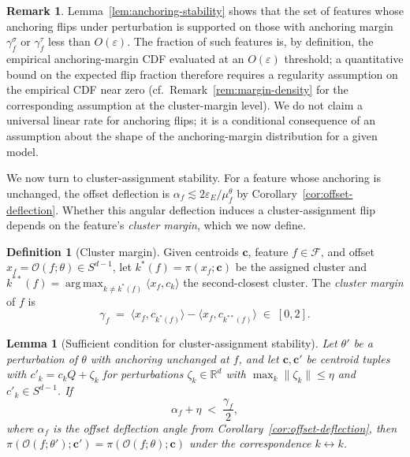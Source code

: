 \documentclass[11pt,letterpaper]{article}
\newtheorem{lemma}[theorem]{Lemma}
\theoremstyle{definition}
\newtheorem{definition}[theorem]{Definition}
\newtheorem{remark}[theorem]{Remark}
\DeclareMathOperator*{\argmax}{arg\,max}
\begin{document}
\begin{remark}
Lemma~\ref{lem:anchoring-stability} shows that the set of features whose anchoring flips under perturbation is supported on those with anchoring margin $\gamma_f^\sigma$ or $\gamma_f^\tau$ less than $O(\varepsilon)$. The fraction of such features is, by definition, the empirical anchoring-margin CDF evaluated at an $O(\varepsilon)$ threshold; a quantitative bound on the expected flip fraction therefore requires a regularity assumption on the empirical CDF near zero (cf.\ Remark~\ref{rem:margin-density} for the corresponding assumption at the cluster-margin level). We do not claim a universal linear rate for anchoring flips; it is a conditional consequence of an assumption about the shape of the anchoring-margin distribution for a given model.
\end{remark}

We now turn to cluster-assignment stability. For a feature whose anchoring is unchanged, the offset deflection is $\alpha_f \lesssim 2\varepsilon_E / \mu_f^\theta$ by Corollary~\ref{cor:offset-deflection}. Whether this angular deflection induces a cluster-assignment flip depends on the feature's \emph{cluster margin}, which we now define.

\begin{definition}[Cluster margin]
\label{def:cluster-margin}
Given centroids $\mathbf{c}$, feature $f \in \mathcal{F}$, and offset $x_f = \mathcal{O}(f; \theta) \in S^{d-1}$, let $k^*(f) = \pi(x_f; \mathbf{c})$ be the assigned cluster and $k^{**}(f) = \argmax_{k \neq k^*(f)} \langle x_f, c_k \rangle$ the second-closest cluster. The \emph{cluster margin} of $f$ is
\[
\gamma_f \;=\; \langle x_f, c_{k^*(f)} \rangle - \langle x_f, c_{k^{**}(f)} \rangle \;\in\; [0, 2].
\]
\end{definition}

\begin{lemma}[Sufficient condition for cluster-assignment stability]
\label{lem:assignment-stability}
Let $\theta'$ be a perturbation of $\theta$ with anchoring unchanged at $f$, and let $\mathbf{c}, \mathbf{c}'$ be centroid tuples with $c'_k = c_k Q + \zeta_k$ for perturbations $\zeta_k \in \mathbb{R}^d$ with $\max_k \|\zeta_k\| \leq \eta$ and $c'_k \in S^{d-1}$. If
\[
\alpha_f + \eta \;<\; \frac{\gamma_f}{2},
\]
where $\alpha_f$ is the offset deflection angle from Corollary~\ref{cor:offset-deflection}, then $\pi(\mathcal{O}(f; \theta'); \mathbf{c}') = \pi(\mathcal{O}(f; \theta); \mathbf{c})$ under the correspondence $k \leftrightarrow k$.
\end{lemma}
\end{document}
